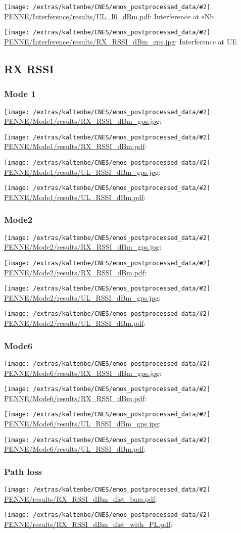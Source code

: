 \documentclass[a4paper,10pt]{article}
\newcommand{\printfile}[2][]{
 \begin{minipage}{8cm}
  \centering
  \texttt{[image: /extras/kaltenbe/CNES/emos\_postprocessed\_data/\#2]}
  \url{#2}: #1

 \end{minipage}
}
\begin{document}
\printfile[Interference at eNb]{PENNE/Interference/results/UL_I0_dBm.pdf}
\printfile[Interference at UE]{PENNE/Interference/results/RX_RSSI_dBm_gps.jpg}


\subsection{RX RSSI}


% 

\subsubsection{Mode 1}
\printfile{PENNE/Mode1/results/RX_RSSI_dBm_gps.jpg}
\printfile{PENNE/Mode1/results/RX_RSSI_dBm.pdf}

\printfile{PENNE/Mode1/results/UL_RSSI_dBm_gps.jpg}
\printfile{PENNE/Mode1/results/UL_RSSI_dBm.pdf}

\subsubsection{Mode2}

\printfile{PENNE/Mode2/results/RX_RSSI_dBm_gps.jpg}
\printfile{PENNE/Mode2/results/RX_RSSI_dBm.pdf}

\printfile{PENNE/Mode2/results/UL_RSSI_dBm_gps.jpg}
\printfile{PENNE/Mode2/results/UL_RSSI_dBm.pdf}

\subsubsection{Mode6}
\printfile{PENNE/Mode6/results/RX_RSSI_dBm_gps.jpg}
\printfile{PENNE/Mode6/results/RX_RSSI_dBm.pdf}

\printfile{PENNE/Mode6/results/UL_RSSI_dBm_gps.jpg}
\printfile{PENNE/Mode6/results/UL_RSSI_dBm.pdf}

\subsubsection{Path loss}

\printfile{PENNE/results/RX_RSSI_dBm_dist_bars.pdf}
\printfile{PENNE/results/RX_RSSI_dBm_dist_with_PL.pdf}
\end{document}
